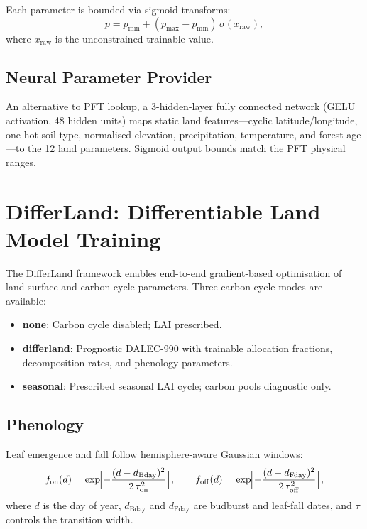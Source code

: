 \documentclass[11pt,twoside]{report}
\begin{document}
Each parameter is bounded via sigmoid transforms:
\begin{equation}
  p = p_{\min} + (p_{\max}-p_{\min})\,\sigma(x_{\mathrm{raw}}),
\end{equation}
where $x_{\mathrm{raw}}$ is the unconstrained trainable value.

\subsection{Neural Parameter Provider}

An alternative to PFT lookup, a 3-hidden-layer fully connected network (GELU activation, 48 hidden units) maps static land features---cyclic latitude/longitude, one-hot soil type, normalised elevation, precipitation, temperature, and forest age---to the 12 land parameters.  Sigmoid output bounds match the PFT physical ranges.


\section{DifferLand: Differentiable Land Model Training}
\label{sec:differland}

The DifferLand framework enables end-to-end gradient-based optimisation of land surface and carbon cycle parameters.  Three carbon cycle modes are available:
\begin{itemize}[nosep]
  \item \textbf{none}: Carbon cycle disabled; LAI prescribed.
  \item \textbf{differland}: Prognostic DALEC-990 with trainable allocation fractions, decomposition rates, and phenology parameters.
  \item \textbf{seasonal}: Prescribed seasonal LAI cycle; carbon pools diagnostic only.
\end{itemize}

\subsection{Phenology}

Leaf emergence and fall follow hemisphere-aware Gaussian windows:
\begin{equation}
  f_{\mathrm{on}}(d) = \exp\!\Bigl[-\frac{(d-d_{\mathrm{Bday}})^2}{2\,\tau_{\mathrm{on}}^2}\Bigr],
  \qquad
  f_{\mathrm{off}}(d) = \exp\!\Bigl[-\frac{(d-d_{\mathrm{Fday}})^2}{2\,\tau_{\mathrm{off}}^2}\Bigr],
\end{equation}
where $d$ is the day of year, $d_{\mathrm{Bday}}$ and $d_{\mathrm{Fday}}$ are budburst and leaf-fall dates, and $\tau$ controls the transition width.
\end{document}
